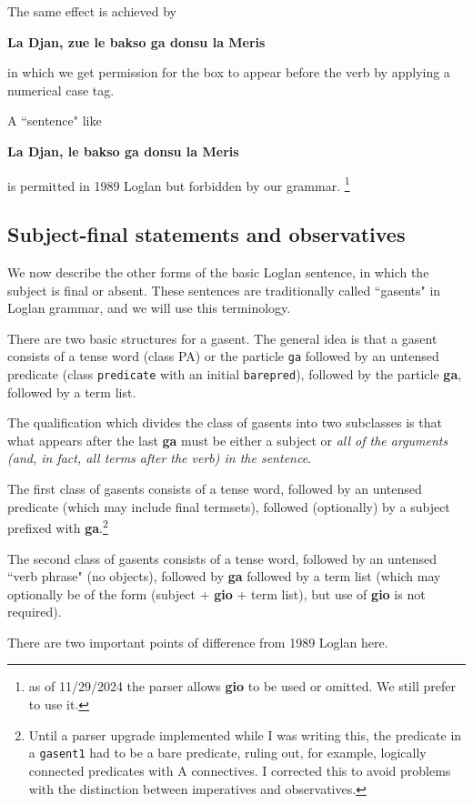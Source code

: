 \documentclass[12pt]{book}
\begin{document}
{The same effect is achieved by

{\bf La Djan, zue le bakso ga donsu la Meris}

in which we get permission for the box to appear before the verb by applying a numerical case tag.

A ``sentence" like

{\bf*La Djan, le bakso ga donsu la Meris}

is permitted in 1989 Loglan but forbidden by our grammar. \footnote{as of 11/29/2024 the parser allows {\bf gio} to be used or omitted.  We still prefer to use it.}

\subsection{Subject-final statements and observatives}

We now describe the other forms of the basic Loglan sentence, in which the subject is final or absent.  These sentences are traditionally called
``gasents" in Loglan grammar, and we will use this terminology.

There are two basic structures for a gasent.  The general idea is that a gasent consists of a tense word (class PA) or the particle {\tt ga} followed by an untensed predicate  (class {\tt predicate} with an initial {\tt barepred}), followed by the particle {\bf ga}, followed by a term list.  

The qualification which divides the class of gasents into two subclasses is that what appears after the last {\bf ga} must be either a subject or
{\em all of the arguments  (and, in fact, all terms after the verb) in the sentence\/}. 

The first class of gasents consists of a tense word, followed by an untensed predicate (which may include final termsets), followed (optionally) by a subject prefixed with {\bf ga}.\footnote{Until a parser upgrade implemented while I was writing this, the predicate in a {\tt gasent1} had to be a bare predicate, ruling out, for example, logically connected predicates with A connectives.   I corrected this to avoid problems with the distinction between imperatives and observatives.}

The second class of gasents consists of a tense word, followed by an untensed ``verb phrase" (no objects), followed by {\bf ga} followed by a term list
(which may optionally be of the form (subject + {\bf gio} + term list), but use of {\bf gio} is not required).

There are two important points of difference from 1989 Loglan here.

}
\end{document}
